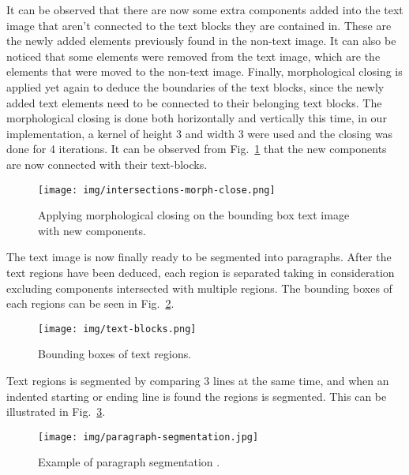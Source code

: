 \documentclass[conference]{IEEEtran}
\begin{document}
    It can be observed that there are now some extra components added into the text image
    that aren't connected to the text blocks they are contained in.
    These are the newly added elements previously found in the non-text image.
    It can also be noticed that some elements were removed from the text image, which
    are the elements that were moved to the non-text image.
    Finally, morphological closing is applied yet again to deduce the boundaries of the text blocks,
    since the newly added text elements need to be connected to their belonging text blocks.
    The morphological closing is done both horizontally and vertically this time, in our implementation,
    a kernel of height 3 and width 3 were used and the closing was done for 4 iterations.
    It can be observed from Fig.~\ref{img:intersections-morph-close} that the new components are now
    connected with their text-blocks.

    \begin{figure}[htbp]
        \centerline{\texttt{[image: img/intersections-morph-close.png]}}
        \caption{Applying morphological closing on the bounding box text image with new components.}
        \label{img:intersections-morph-close}
    \end{figure}

    The text image is now finally ready to be segmented into paragraphs.
    After the text regions have been deduced, each region is separated taking in consideration
    excluding components intersected with multiple regions.
    The bounding boxes of each regions can be seen in Fig.~\ref{img:text-blocks}.

    \begin{figure}[htbp]
        \centerline{\texttt{[image: img/text-blocks.png]}}
        \caption{Bounding boxes of text regions.}
        \label{img:text-blocks}
    \end{figure}

    Text regions is segmented by comparing 3 lines at the same time, and when an indented starting
    or ending line is found the regions is segmented.
    This can be illustrated in Fig.~\ref{fig:paragraph-segmentation}.

    \begin{figure}[htbp]
        \centerline{\texttt{[image: img/paragraph-segmentation.jpg]}}
        \caption{Example of paragraph segmentation \cite{mhs}.}
        \label{fig:paragraph-segmentation}
    \end{figure}
\end{document}
